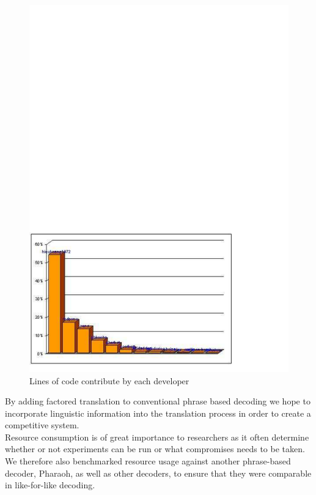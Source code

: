 \documentclass[10pt]{report}
\theoremstyle{plain}
\begin{document}
{\begin{center}
\begin{figure}[h]
\centering
\includegraphics[scale=0.8]{hieu-1}
\caption{Lines of code contribute by each developer}
\end{figure}
\end{center}

By adding factored translation to conventional phrase based decoding we hope to incorporate linguistic information into the translation process in order to create a competitive system.\\

Resource consumption is of great importance to researchers as it often determine whether or not experiments can be run or what compromises needs to be taken. We therefore also benchmarked resource usage against another phrase-based decoder, Pharaoh, as well as other decoders, to ensure that they were comparable in like-for-like decoding.\\

}
\end{document}
